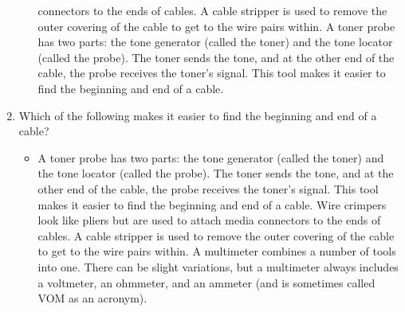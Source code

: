 \documentclass{article}
\begin{document}
\begin{enumerate}
\begin{itemize}
connectors to the ends of cables. A cable stripper is used to remove the outer covering of the
cable to get to the wire pairs within. A toner probe has two parts: the tone generator (called
the toner) and the tone locator (called the probe). The toner sends the tone, and at the other
end of the cable, the probe receives the toner’s signal. This tool makes it easier to find the
beginning and end of a cable.
    \end{itemize}
    \item Which of the following makes it easier to find the beginning and end of a cable?
    \begin{itemize}
        \item A toner probe has two parts: the tone generator (called the toner) and the tone locator
(called the probe). The toner sends the tone, and at the other end of the cable, the probe
receives the toner’s signal. This tool makes it easier to find the beginning and end of a cable.
Wire crimpers look like pliers but are used to attach media connectors to the ends of cables.
A cable stripper is used to remove the outer covering of the cable to get to the wire pairs
within. A multimeter combines a number of tools into one. There can be slight variations,
but a multimeter always includes a voltmeter, an ohmmeter, and an ammeter (and is
sometimes called VOM as an acronym).
    \end{itemize}
\end{enumerate}
\end{document}
